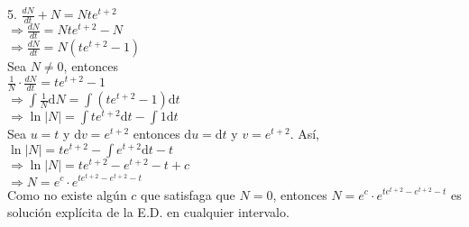 \documentclass{article}
\begin{document}
      5. $ \displaystyle \frac{dN}{dt}+N=Nte^{t+2} $ \\

      $ \displaystyle \Longrightarrow \frac{dN}{dt}=Nte^{t+2}-N $ \\

      $ \displaystyle \Longrightarrow \frac{dN}{dt}=N(te^{t+2}-1) $ \\

      Sea $ N \neq 0 $, entonces \\

      $ \displaystyle \frac{1}{N}  \cdot \frac{dN}{dt}=te^{t+2}-1 $ \\

      $ \displaystyle \Longrightarrow \int \frac{1}{N} \mathrm{d}N = \int (te^{t+2}-1) \mathrm{d}t $ \\

      $ \displaystyle \Longrightarrow \ln |N| = \int te^{t+2} \mathrm{d}t - \int 1 \mathrm{d}t $ \\
      
      Sea $ u=t $ y $ \mathrm{d}v = e^{t+2} $ entonces $ \mathrm{d}u = \mathrm{d}t $ y $ v = e^{t+2} $. Así, \\

      $ \displaystyle \ln |N| = te^{t+2} - \int e^{t+2}\mathrm{d}t - t $ \\

      $ \Longrightarrow \ln |N| = te^{t+2} - e^{t+2} - t + c $ \\

      $ \Longrightarrow N = e^c \cdot e^{te^{t+2} - e^{t+2} - t} $ \\

      Como no existe algún $ c $ que satisfaga que $ N = 0 $, entonces $ N = e^c \cdot e^{te^{t+2} - e^{t+2} - t} $ es solución explícita de la E.D. en cualquier intervalo.
\end{document}
